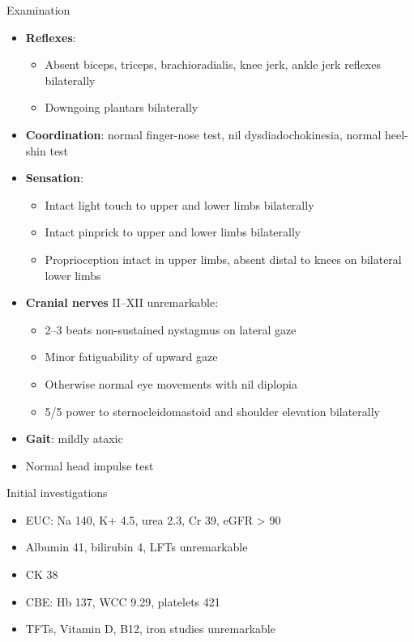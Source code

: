 \documentclass[
  ignorenonframetext,
]{beamer}
\providecommand{\tightlist}{%
  \setlength{\itemsep}{0pt}\setlength{\parskip}{0pt}}
\begin{document}
\begin{frame}{Examination}
\protect\hypertarget{examination-2}{}
\begin{itemize}
\tightlist
\item
  \textbf{Reflexes}:

  \begin{itemize}
  \tightlist
  \item
    Absent biceps, triceps, brachioradialis, knee jerk, ankle jerk
    reflexes bilaterally
  \item
    Downgoing plantars bilaterally
  \end{itemize}
\item
  \textbf{Coordination}: normal finger-nose test, nil
  dysdiadochokinesia, normal heel-shin test
\item
  \textbf{Sensation}:

  \begin{itemize}
  \tightlist
  \item
    Intact light touch to upper and lower limbs bilaterally
  \item
    Intact pinprick to upper and lower limbs bilaterally
  \item
    Proprioception intact in upper limbs, absent distal to knees on
    bilateral lower limbs
  \end{itemize}
\item
  \textbf{Cranial nerves} II--XII unremarkable:

  \begin{itemize}
  \tightlist
  \item
    2--3 beats non-sustained nystagmus on lateral gaze
  \item
    Minor fatiguability of upward gaze
  \item
    Otherwise normal eye movements with nil diplopia
  \item
    5/5 power to sternocleidomastoid and shoulder elevation bilaterally
  \end{itemize}
\item
  \textbf{Gait}: mildly ataxic
\item
  Normal head impulse test
\end{itemize}
\end{frame}

\begin{frame}{Initial investigations}
\protect\hypertarget{initial-investigations}{}
\begin{itemize}
\tightlist
\item
  EUC: Na 140, K+ 4.5, urea 2.3, Cr 39, eGFR \textgreater{} 90
\item
  Albumin 41, bilirubin 4, LFTs unremarkable
\item
  CK 38
\item
  CBE: Hb 137, WCC 9.29, platelets 421
\item
  TFTs, Vitamin D, B12, iron studies unremarkable
\end{itemize}
\end{frame}
\end{document}

